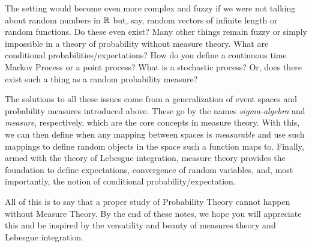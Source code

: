 The setting would become even more complex and fuzzy if we were not talking about random numbers in $\mathbb R$ but, say, random vectors of infinite length or random functions. Do these even exist? Many other things remain fuzzy or simply impossible in a theory of probability without measure theory. What are conditional probabilities/expectations? How do you define a continuous time Markov Process or a point process? What is a stochastic process? Or, does there exist such a thing as a random probability measure?

The solutions to all these issues come from a generalization of event spaces and probability measures introduced above. These go by the names \emph{sigma-algebra} and \emph{measure}, respectively, which are the core concepts in measure theory. With this, we can then define when any mapping between spaces is \emph{measurable} and use such mappings to define random objects in the space such a function maps to. Finally, armed with the theory of Lebesgue integration, measure theory provides the foundation to define expectations, convergence of random variables, and, most importantly, the notion of conditional probability/expectation. 

All of this is to say that a proper study of Probability Theory cannot happen without Measure Theory. By the end of these notes, we hope you will appreciate this and be inspired by the versatility and beauty of measures theory and Lebesgue integration.



